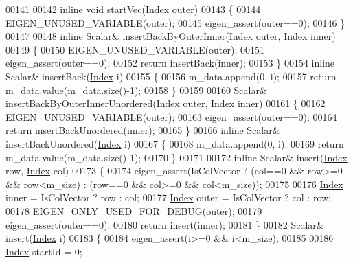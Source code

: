 \begin{DoxyCode}
00141 
00142     \textcolor{keyword}{inline} \textcolor{keywordtype}{void} startVec(\hyperlink{group___core___module_a554f30542cc2316add4b1ea0a492ff02}{Index} outer)
00143     \{
00144       EIGEN\_UNUSED\_VARIABLE(outer);
00145       eigen\_assert(outer==0);
00146     \}
00147 
00148     \textcolor{keyword}{inline} Scalar& insertBackByOuterInner(\hyperlink{group___core___module_a554f30542cc2316add4b1ea0a492ff02}{Index} outer, \hyperlink{group___core___module_a554f30542cc2316add4b1ea0a492ff02}{Index} inner)
00149     \{
00150       EIGEN\_UNUSED\_VARIABLE(outer);
00151       eigen\_assert(outer==0);
00152       \textcolor{keywordflow}{return} insertBack(inner);
00153     \}
00154     \textcolor{keyword}{inline} Scalar& insertBack(\hyperlink{group___core___module_a554f30542cc2316add4b1ea0a492ff02}{Index} i)
00155     \{
00156       m\_data.append(0, i);
00157       \textcolor{keywordflow}{return} m\_data.value(m\_data.size()-1);
00158     \}
00159     
00160     Scalar& insertBackByOuterInnerUnordered(\hyperlink{group___core___module_a554f30542cc2316add4b1ea0a492ff02}{Index} outer, \hyperlink{group___core___module_a554f30542cc2316add4b1ea0a492ff02}{Index} inner)
00161     \{
00162       EIGEN\_UNUSED\_VARIABLE(outer);
00163       eigen\_assert(outer==0);
00164       \textcolor{keywordflow}{return} insertBackUnordered(inner);
00165     \}
00166     \textcolor{keyword}{inline} Scalar& insertBackUnordered(\hyperlink{group___core___module_a554f30542cc2316add4b1ea0a492ff02}{Index} i)
00167     \{
00168       m\_data.append(0, i);
00169       \textcolor{keywordflow}{return} m\_data.value(m\_data.size()-1);
00170     \}
00171 
00172     \textcolor{keyword}{inline} Scalar& insert(\hyperlink{group___core___module_a554f30542cc2316add4b1ea0a492ff02}{Index} row, \hyperlink{group___core___module_a554f30542cc2316add4b1ea0a492ff02}{Index} col)
00173     \{
00174       eigen\_assert(IsColVector ? (col==0 && row>=0 && row<m\_size) : (row==0 && col>=0 && col<m\_size));
00175       
00176       \hyperlink{group___core___module_a554f30542cc2316add4b1ea0a492ff02}{Index} inner = IsColVector ? row : col;
00177       \hyperlink{group___core___module_a554f30542cc2316add4b1ea0a492ff02}{Index} outer = IsColVector ? col : row;
00178       EIGEN\_ONLY\_USED\_FOR\_DEBUG(outer);
00179       eigen\_assert(outer==0);
00180       \textcolor{keywordflow}{return} insert(inner);
00181     \}
00182     Scalar& insert(\hyperlink{group___core___module_a554f30542cc2316add4b1ea0a492ff02}{Index} i)
00183     \{
00184       eigen\_assert(i>=0 && i<m\_size);
00185       
00186       \hyperlink{group___core___module_a554f30542cc2316add4b1ea0a492ff02}{Index} startId = 0;

\end{DoxyCode}

